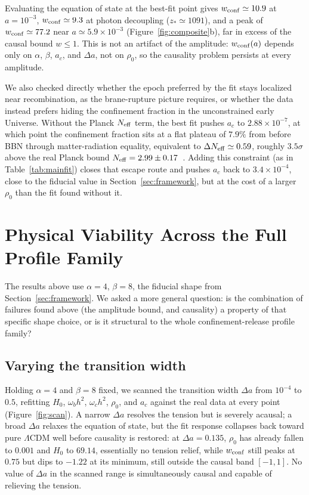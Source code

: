 \documentclass[11pt,a4paper,twocolumn]{article}
\begin{document}
Evaluating the equation of state at the best-fit point gives $w_{\rm conf} \simeq 10.9$ at $a = 10^{-3}$, $w_{\rm conf} \simeq 9.3$ at photon decoupling ($z_\ast \simeq 1091$), and a peak of $w_{\rm conf} \simeq 77.2$ near $a \simeq 5.9\times10^{-3}$ (Figure~\ref{fig:composite}b), far in excess of the causal bound $w \leq 1$. This is not an artifact of the amplitude: $w_{\rm conf}(a)$ depends only on $\alpha$, $\beta$, $a_c$, and $\Delta a$, not on $\rho_0$, so the causality problem persists at every amplitude.

We also checked directly whether the epoch preferred by the fit stays localized near recombination, as the brane-rupture picture requires, or whether the data instead prefers hiding the confinement fraction in the unconstrained early Universe. Without the Planck $N_{\rm eff}$ term, the best fit pushes $a_c$ to $2.88\times10^{-7}$, at which point the confinement fraction sits at a flat plateau of $7.9\%$ from before BBN through matter-radiation equality, equivalent to $\Delta N_{\rm eff} \simeq 0.59$, roughly $3.5\sigma$ above the real Planck bound $N_{\rm eff} = 2.99 \pm 0.17$~\cite{planck2018}. Adding this constraint (as in Table~\ref{tab:mainfit}) closes that escape route and pushes $a_c$ back to $3.4\times10^{-4}$, close to the fiducial value in Section~\ref{sec:framework}, but at the cost of a larger $\rho_0$ than the fit found without it.

\section{Physical Viability Across the Full Profile Family}
\label{sec:viability}
The results above use $\alpha = 4$, $\beta = 8$, the fiducial shape from Section~\ref{sec:framework}. We asked a more general question: is the combination of failures found above (the amplitude bound, and causality) a property of that specific shape choice, or is it structural to the whole confinement-release profile family?

\subsection{Varying the transition width}
Holding $\alpha = 4$ and $\beta = 8$ fixed, we scanned the transition width $\Delta a$ from $10^{-4}$ to $0.5$, refitting $H_0$, $\omega_b h^2$, $\omega_c h^2$, $\rho_0$, and $a_c$ against the real data at every point (Figure~\ref{fig:scan}). A narrow $\Delta a$ resolves the tension but is severely acausal; a broad $\Delta a$ relaxes the equation of state, but the fit response collapses back toward pure $\Lambda$CDM well before causality is restored: at $\Delta a = 0.135$, $\rho_0$ has already fallen to $0.001$ and $H_0$ to $69.14$, essentially no tension relief, while $w_{\rm conf}$ still peaks at $0.75$ but dips to $-1.22$ at its minimum, still outside the causal band $[-1,1]$. No value of $\Delta a$ in the scanned range is simultaneously causal and capable of relieving the tension.
\end{document}
